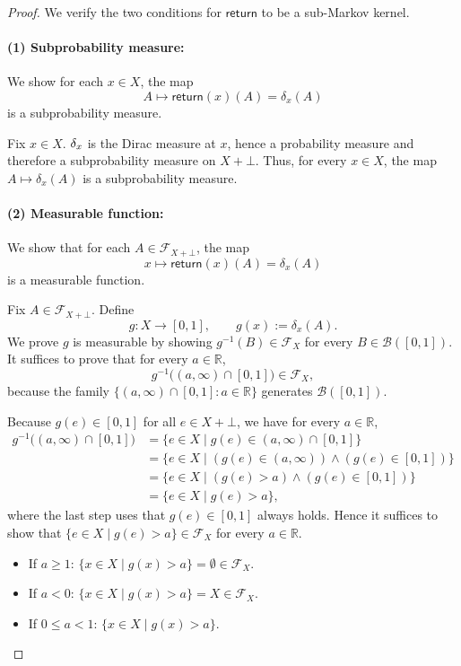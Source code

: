 \begin{proof}
	We verify the two conditions for $\mathsf{return}$ to be a sub-Markov kernel.

	\paragraph{(1) Subprobability measure:}
	We show for each $x \in X$, the map 
	\[
		A \mapsto \mathsf{return}(x)(A) = \delta_x(A)
	\]
	is a subprobability measure.

	Fix $x \in X$. $\delta_{x}$ is the Dirac measure at $x$, hence a probability measure and therefore a subprobability measure on $X+\bot$. Thus, for every $x\in X$, the map $A \mapsto \delta_x(A)$ is a subprobability measure.

	\paragraph{(2) Measurable function:}
	We show that for each $A \in \mathcal{F}_{X+\bot}$, the map
	\[
		x \mapsto \mathsf{return}(x)(A)=\delta_x(A)
	\]
	is a measurable function.

	Fix $A \in \mathcal{F}_{X+\bot}$. Define
	\[
		g : X \to [0,1], \qquad g(x) := \delta_x(A).
	\]
	We prove $g$ is measurable by showing $g^{-1}(B)\in\mathcal{F}_X$ for every
	$B\in\mathcal{B}([0,1])$. It suffices to prove that for every $a\in\mathbb{R}$,
	\[
		g^{-1}\big((a,\infty)\cap[0,1]\big)\in\mathcal{F}_X,
	\]
	because the family $\{(a,\infty)\cap[0,1] : a\in\mathbb{R}\}$ generates
	$\mathcal{B}([0,1])$.

	Because $g(e)\in[0,1]$ for all $e\in X+\bot$, we have for every $a\in\mathbb{R}$,
	\begin{align*}
		g^{-1}\big((a,\infty)\cap[0,1]\big)
		&= \{e\in X \mid g(e)\in (a,\infty)\cap[0,1]\} \\
		&= \{e\in X \mid (g(e)\in (a,\infty)) \wedge (g(e)\in [0,1])\} \\
		&= \{e\in X \mid (g(e)>a) \wedge (g(e)\in [0,1])\} \\
		&= \{e\in X \mid g(e)>a\},
	\end{align*}
	where the last step uses that $g(e)\in[0,1]$ always holds.
	Hence it suffices to show that $\{e\in X \mid g(e)>a\}\in\mathcal{F}_{X}$
	for every $a\in\mathbb{R}$.

	\begin{itemize}
		\item If $a \geq 1$: $\{x\in X \mid g(x)>a\} = \emptyset \in \mathcal{F}_{X}$.
		\item If $a < 0$: $\{x\in X \mid g(x)>a\} = X \in \mathcal{F}_{X}$.
		\item If $0 \leq a < 1$: $\{x \in X \mid g(x) > a \}$.
	\end{itemize}


\end{proof}
